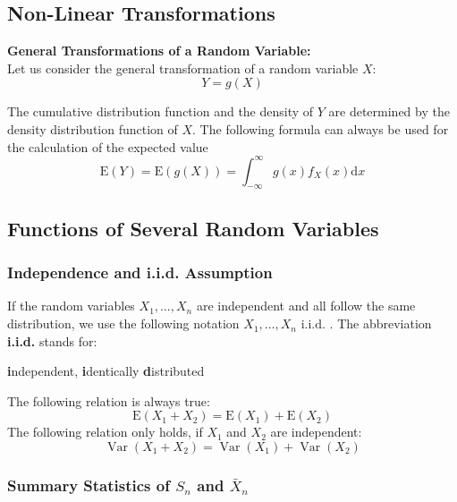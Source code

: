 \documentclass[11pt]{article}
\begin{document}
\subsection{Non-Linear Transformations}

\begin{definition}
	\textbf{General Transformations of a Random Variable:}\\
	Let us consider the general transformation of a random variable $X$:
	\begin{equation*}
		Y=g(X)
	\end{equation*}
	
	The cumulative distribution function and the density of $Y$ are determined by the density distribution function of $X$. The following formula can always be used for the calculation of the expected value
	\begin{equation*}
		\mathrm{E}(Y)=\mathrm{E}(g(X))=\int_{-\infty}^{\infty} g(x) f_X(x) \mathrm{d} x
	\end{equation*}
\end{definition}

\subsection{Functions of Several Random Variables}
\subsubsection{Independence and i.i.d. Assumption}
If the random variables $X_1, \ldots, X_n$ are independent and all follow the same distribution, we use the following notation $X_1, \ldots, X_n \text{ i.i.d. }$. The abbreviation \textbf{i.i.d.} stands for:
\begin{center}
\textbf{i}ndependent, \textbf{i}dentically \textbf{d}istributed
\end{center}

\noindent
The following relation is always true:
$$
\mathrm{E}\left(X_1+X_2\right)=\mathrm{E}\left(X_1\right)+\mathrm{E}\left(X_2\right)
$$
The following relation only holds, if $X_1$ and $X_2$ are independent:
$$
\operatorname{Var}\left(X_1+X_2\right)=\operatorname{Var}\left(X_1\right)+\operatorname{Var}\left(X_2\right)
$$

\subsubsection{Summary Statistics of $S_n$ and $\bar{X}_n$}
\end{document}
